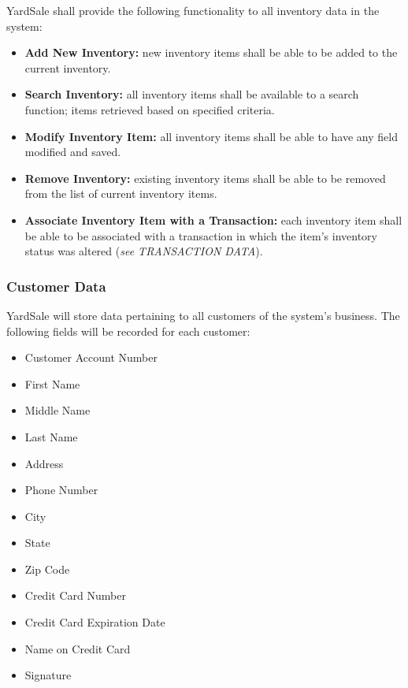 \documentclass{report}
\begin{document}
                \noindent YardSale shall provide the following functionality
                to all inventory data in the system:

                \begin{itemize}
                    \item {\bf Add New Inventory:} new inventory items
                    shall be able to be added to the current
                    inventory.
                    \item {\bf Search Inventory:} all inventory
                    items shall be available to a search function;
                    items retrieved based on specified criteria.
                    \item {\bf Modify Inventory Item:} all inventory items
                    shall be able to have any field modified and
                    saved.
                    \item {\bf Remove Inventory:} existing inventory
                    items shall be able to be removed from the
                    list of current inventory items.
                    \item {\bf Associate Inventory Item with a Transaction:}
                    each inventory item shall be able to be
                    associated with a transaction in which the
                    item's inventory status was altered ({\sl see
                    TRANSACTION DATA}).
                \end{itemize}

            \subsubsection{Customer Data}
                YardSale will store data pertaining to all
                customers of the system's business.
                The following fields will be recorded for each
                customer:

                \begin{itemize}
                    \item Customer Account Number
                    \item First Name
                    \item Middle Name
                    \item Last Name
                    \item Address
                    \item Phone Number
                    \item City
                    \item State
                    \item Zip Code
                    \item Credit Card Number
                    \item Credit Card Expiration Date
                    \item Name on Credit Card
                    \item Signature
                \end{itemize}
\end{document}
